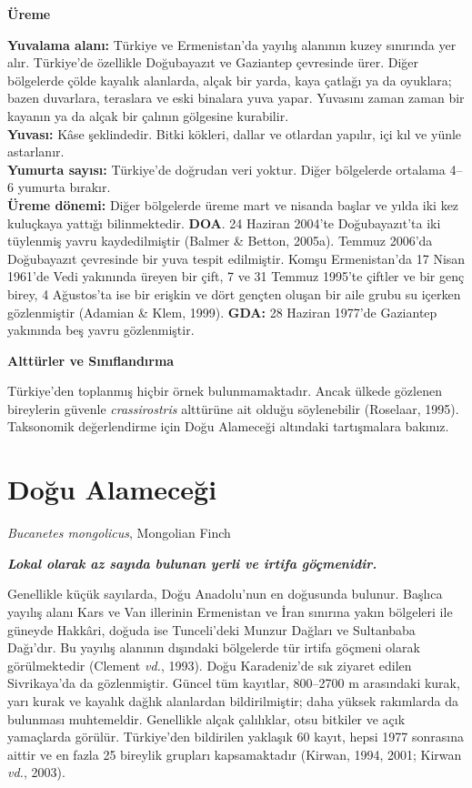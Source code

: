 \documentclass[
  10.5pt,
  a4paper,
  DIV=11,
  numbers=noendperiod,
  twocolumn]{scrreprt}
\begin{document}
\textbf{Üreme}

\textbf{Yuvalama alanı:} Türkiye ve Ermenistan'da yayılış alanının kuzey
sınırında yer alır. Türkiye'de özellikle Doğubayazıt ve Gaziantep
çevresinde ürer. Diğer bölgelerde çölde kayalık alanlarda, alçak bir
yarda, kaya çatlağı ya da oyuklara; bazen duvarlara, teraslara ve eski
binalara yuva yapar. Yuvasını zaman zaman bir kayanın ya da alçak bir
çalının gölgesine kurabilir.\\
\textbf{Yuvası:} Kâse şeklindedir. Bitki kökleri, dallar ve otlardan
yapılır, içi kıl ve yünle astarlanır.\\
\textbf{Yumurta sayısı:} Türkiye'de doğrudan veri yoktur. Diğer
bölgelerde ortalama 4--6 yumurta bırakır.\\
\textbf{Üreme dönemi:} Diğer bölgelerde üreme mart ve nisanda başlar ve
yılda iki kez kuluçkaya yattığı bilinmektedir. \textbf{DOA}. 24 Haziran
2004'te Doğubayazıt'ta iki tüylenmiş yavru kaydedilmiştir (Balmer \&
Betton, 2005a). Temmuz 2006'da Doğubayazıt çevresinde bir yuva tespit
edilmiştir. Komşu Ermenistan'da 17 Nisan 1961'de Vedi yakınında üreyen
bir çift, 7 ve 31 Temmuz 1995'te çiftler ve bir genç birey, 4 Ağustos'ta
ise bir erişkin ve dört gençten oluşan bir aile grubu su içerken
gözlenmiştir (Adamian \& Klem, 1999). \textbf{GDA:} 28 Haziran 1977'de
Gaziantep yakınında beş yavru gözlenmiştir.

\textbf{Alttürler ve Sınıflandırma}

Türkiye'den toplanmış hiçbir örnek bulunmamaktadır. Ancak ülkede
gözlenen bireylerin güvenle \emph{crassirostris} alttürüne ait olduğu
söylenebilir (Roselaar, 1995). Taksonomik değerlendirme için Doğu
Alameceği altındaki tartışmalara bakınız.

\section{Doğu Alameceği}\label{doux11fu-alameceux11fi}

\emph{Bucanetes mongolicus}, Mongolian Finch

\textbf{\emph{Lokal olarak az sayıda bulunan yerli ve irtifa
göçmenidir.}}

Genellikle küçük sayılarda, Doğu Anadolu'nun en doğusunda bulunur.
Başlıca yayılış alanı Kars ve Van illerinin Ermenistan ve İran sınırına
yakın bölgeleri ile güneyde Hakkâri, doğuda ise Tunceli'deki Munzur
Dağları ve Sultanbaba Dağı'dır. Bu yayılış alanının dışındaki bölgelerde
tür irtifa göçmeni olarak görülmektedir (Clement \emph{vd.}, 1993). Doğu
Karadeniz'de sık ziyaret edilen Sivrikaya'da da gözlenmiştir. Güncel tüm
kayıtlar, 800--2700 m arasındaki kurak, yarı kurak ve kayalık dağlık
alanlardan bildirilmiştir; daha yüksek rakımlarda da bulunması
muhtemeldir. Genellikle alçak çalılıklar, otsu bitkiler ve açık
yamaçlarda görülür. Türkiye'den bildirilen yaklaşık 60 kayıt, hepsi 1977
sonrasına aittir ve en fazla 25 bireylik grupları kapsamaktadır (Kirwan,
1994, 2001; Kirwan \emph{vd.}, 2003).
\end{document}
